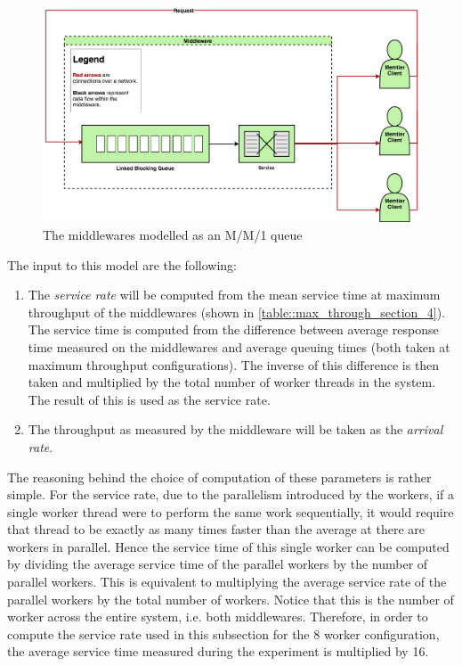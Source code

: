 \documentclass[11pt,a4paper]{article}
\begin{document}
\begin{figure}[!h]
    \centering
    \includegraphics[width=\textwidth]{processing/graphics/mm1_queue.png}
    \caption{The middlewares modelled as an M/M/1 queue}
    \label{png::mm1_queue}
\end{figure}

The input to this model are the following:
\begin{enumerate}
    \item The \textit{service rate} will be computed from the mean service time at maximum throughput of the middlewares (shown in \ref{table::max_through_section_4}). The service time is computed from the difference between average response time measured on the middlewares and average queuing times (both taken at maximum throughput configurations). The inverse of this difference is then taken and multiplied by the total number of worker threads in the system. The result of this is used as the service rate.
    \item The throughput as measured by the middleware will be taken as the \textit{arrival rate}.
\end{enumerate}

The reasoning behind the choice of computation of these parameters is rather simple. For the service rate, due to the parallelism introduced by the workers, if a single worker thread were to perform the same work sequentially, it would require that thread to be exactly as many times faster than the average at there are workers in parallel. Hence the service time of this single worker can be computed by dividing the average service time of the parallel workers by the number of parallel workers. This is equivalent to multiplying the average service rate of the parallel workers by the total number of workers. Notice that this is the number of worker across the entire system, i.e. both middlewares. Therefore, in order to compute the service rate used in this subsection for the 8 worker configuration, the average service time measured during the experiment is multiplied by 16.
\end{document}

